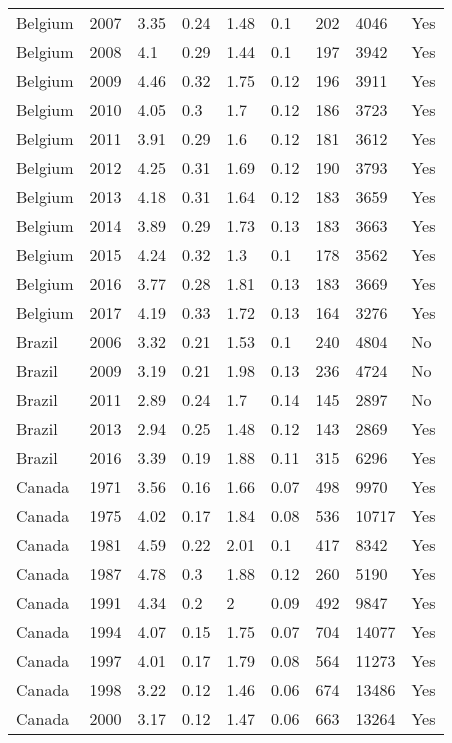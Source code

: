\begin{tabular}{lllllllll}
Belgium & 2007 & 3.35 & 0.24 & 1.48 & 0.1 & 202 & 4046 & Yes \\ 
Belgium & 2008 & 4.1 & 0.29 & 1.44 & 0.1 & 197 & 3942 & Yes \\ 
Belgium & 2009 & 4.46 & 0.32 & 1.75 & 0.12 & 196 & 3911 & Yes \\ 
Belgium & 2010 & 4.05 & 0.3 & 1.7 & 0.12 & 186 & 3723 & Yes \\ 
Belgium & 2011 & 3.91 & 0.29 & 1.6 & 0.12 & 181 & 3612 & Yes \\ 
Belgium & 2012 & 4.25 & 0.31 & 1.69 & 0.12 & 190 & 3793 & Yes \\ 
Belgium & 2013 & 4.18 & 0.31 & 1.64 & 0.12 & 183 & 3659 & Yes \\ 
Belgium & 2014 & 3.89 & 0.29 & 1.73 & 0.13 & 183 & 3663 & Yes \\ 
Belgium & 2015 & 4.24 & 0.32 & 1.3 & 0.1 & 178 & 3562 & Yes \\ 
Belgium & 2016 & 3.77 & 0.28 & 1.81 & 0.13 & 183 & 3669 & Yes \\ 
Belgium & 2017 & 4.19 & 0.33 & 1.72 & 0.13 & 164 & 3276 & Yes \\ 
Brazil & 2006 & 3.32 & 0.21 & 1.53 & 0.1 & 240 & 4804 & No \\ 
Brazil & 2009 & 3.19 & 0.21 & 1.98 & 0.13 & 236 & 4724 & No \\ 
Brazil & 2011 & 2.89 & 0.24 & 1.7 & 0.14 & 145 & 2897 & No \\ 
Brazil & 2013 & 2.94 & 0.25 & 1.48 & 0.12 & 143 & 2869 & Yes \\ 
Brazil & 2016 & 3.39 & 0.19 & 1.88 & 0.11 & 315 & 6296 & Yes \\ 
Canada & 1971 & 3.56 & 0.16 & 1.66 & 0.07 & 498 & 9970 & Yes \\ 
Canada & 1975 & 4.02 & 0.17 & 1.84 & 0.08 & 536 & 10717 & Yes \\ 
Canada & 1981 & 4.59 & 0.22 & 2.01 & 0.1 & 417 & 8342 & Yes \\ 
Canada & 1987 & 4.78 & 0.3 & 1.88 & 0.12 & 260 & 5190 & Yes \\ 
Canada & 1991 & 4.34 & 0.2 & 2 & 0.09 & 492 & 9847 & Yes \\ 
Canada & 1994 & 4.07 & 0.15 & 1.75 & 0.07 & 704 & 14077 & Yes \\ 
Canada & 1997 & 4.01 & 0.17 & 1.79 & 0.08 & 564 & 11273 & Yes \\ 
Canada & 1998 & 3.22 & 0.12 & 1.46 & 0.06 & 674 & 13486 & Yes \\ 
Canada & 2000 & 3.17 & 0.12 & 1.47 & 0.06 & 663 & 13264 & Yes \\ 

\end{tabular}
